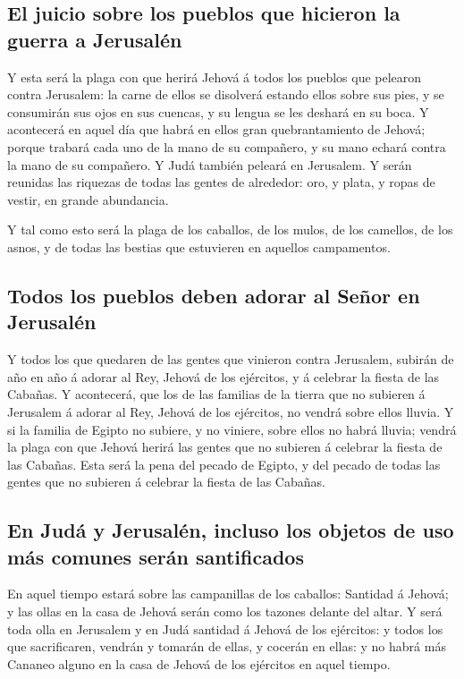 \hypertarget{el-juicio-sobre-los-pueblos-que-hicieron-la-guerra-a-jerusaluxe9n}{%
\subsection{El juicio sobre los pueblos que hicieron la guerra a
Jerusalén}\label{el-juicio-sobre-los-pueblos-que-hicieron-la-guerra-a-jerusaluxe9n}}

 Y esta será la plaga con que herirá Jehová á todos los
pueblos que pelearon contra Jerusalem: la carne de ellos se disolverá
estando ellos sobre sus pies, y se consumirán sus ojos en sus cuencas, y
su lengua se les deshará en su boca.  Y acontecerá en aquel
día que habrá en ellos gran quebrantamiento de Jehová; porque trabará
cada uno de la mano de su compañero, y su mano echará contra la mano de
su compañero.  Y Judá también peleará en Jerusalem. Y serán
reunidas las riquezas de todas las gentes de alrededor: oro, y plata, y
ropas de vestir, en grande abundancia.

 Y tal como esto será la plaga de los caballos, de los
mulos, de los camellos, de los asnos, y de todas las bestias que
estuvieren en aquellos campamentos.

\hypertarget{todos-los-pueblos-deben-adorar-al-seuxf1or-en-jerusaluxe9n}{%
\subsection{Todos los pueblos deben adorar al Señor en
Jerusalén}\label{todos-los-pueblos-deben-adorar-al-seuxf1or-en-jerusaluxe9n}}

 Y todos los que quedaren de las gentes que vinieron contra
Jerusalem, subirán de año en año á adorar al Rey, Jehová de los
ejércitos, y á celebrar la fiesta de las Cabañas.  Y
acontecerá, que los de las familias de la tierra que no subieren á
Jerusalem á adorar al Rey, Jehová de los ejércitos, no vendrá sobre
ellos lluvia.  Y si la familia de Egipto no subiere, y no
viniere, sobre ellos no habrá lluvia; vendrá la plaga con que Jehová
herirá las gentes que no subieren á celebrar la fiesta de las Cabañas.
 Esta será la pena del pecado de Egipto, y del pecado de
todas las gentes que no subieren á celebrar la fiesta de las Cabañas.

\hypertarget{en-juduxe1-y-jerusaluxe9n-incluso-los-objetos-de-uso-muxe1s-comunes-seruxe1n-santificados}{%
\subsection{En Judá y Jerusalén, incluso los objetos de uso más comunes
serán
santificados}\label{en-juduxe1-y-jerusaluxe9n-incluso-los-objetos-de-uso-muxe1s-comunes-seruxe1n-santificados}}

 En aquel tiempo estará sobre las campanillas de los
caballos: Santidad á Jehová; y las ollas en la casa de Jehová serán como
los tazones delante del altar.  Y será toda olla en
Jerusalem y en Judá santidad á Jehová de los ejércitos: y todos los que
sacrificaren, vendrán y tomarán de ellas, y cocerán en ellas: y no habrá
más Cananeo alguno en la casa de Jehová de los ejércitos en aquel
tiempo.
